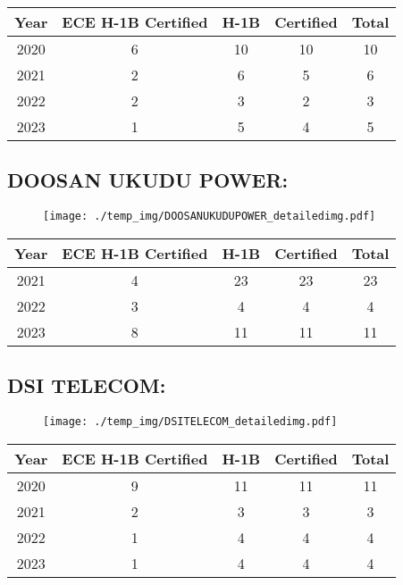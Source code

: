 \documentclass{article}%
\begin{document}
%
\begin{longtable}{c|c|c|c|c}%
\hline%
Year&ECE H{-}1B Certified&H{-}1B&Certified&Total\\%
\hline%
2020&6&10&10&10\\%
\hline%
2021&2&6&5&6\\%
\hline%
2022&2&3&2&3\\%
\hline%
2023&1&5&4&5\\%
\hline%
\end{longtable}

%
\newpage%
\subsection{DOOSAN UKUDU POWER:}%
\label{subsec:DOOSANUKUDUPOWER}%
\label{DOOSANUKUDUPOWERdetailed}%


\begin{figure}[htbp]%
\centering%
\texttt{[image: ./temp\_img/DOOSANUKUDUPOWER\_detailedimg.pdf]}%
\end{figure}

%
\begin{longtable}{c|c|c|c|c}%
\hline%
Year&ECE H{-}1B Certified&H{-}1B&Certified&Total\\%
\hline%
2021&4&23&23&23\\%
\hline%
2022&3&4&4&4\\%
\hline%
2023&8&11&11&11\\%
\hline%
\end{longtable}

%
\newpage%
\subsection{DSI TELECOM:}%
\label{subsec:DSITELECOM}%
\label{DSITELECOMdetailed}%


\begin{figure}[htbp]%
\centering%
\texttt{[image: ./temp\_img/DSITELECOM\_detailedimg.pdf]}%
\end{figure}

%
\begin{longtable}{c|c|c|c|c}%
\hline%
Year&ECE H{-}1B Certified&H{-}1B&Certified&Total\\%
\hline%
2020&9&11&11&11\\%
\hline%
2021&2&3&3&3\\%
\hline%
2022&1&4&4&4\\%
\hline%
2023&1&4&4&4\\%
\hline%
\end{longtable}
\end{document}

